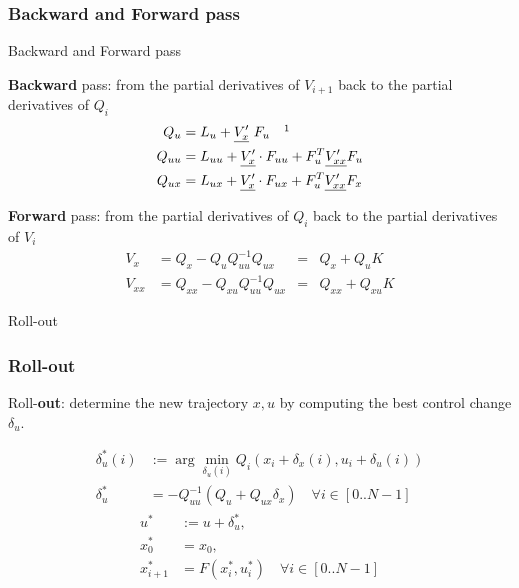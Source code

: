 \documentclass{beamer}
\begin{document}
\subsubsection{Backward and Forward pass}

\begin{frame}{Backward and Forward pass}

\textbf{Backward} pass: from the partial derivatives of $V_{i+1}$ back to the partial derivatives of $Q_i$
\begin{equation}
\label{QfromV}
\begin{split}
Q_u & = L_u + \underline{V'_x}   \ F_u \quad \footnotemark \\
Q_{uu} &= L_{uu} + \underline{V'_x} \cdot F_{uu} + F_u^T \underline{V'_{xx}} F_u \\
Q_{ux} &= L_{ux} + \underline{V'_x} \cdot F_{ux} + F_u^T \underline{V'_{xx}} F_x
\end{split}
\end{equation}


\textbf{Forward} pass: from the partial derivatives of $Q_i$ back to the partial derivatives of $V_i$
\begin{equation}
\label{VfromQ}
\begin{aligned}
V_x &= Q_x - Q_u Q_{uu}^{-1} Q_{ux} &=& Q_x + Q_u K \\
V_{xx} &= Q_{xx} - Q_{xu} Q_{uu}^{-1} Q_{ux} &=& Q_{xx} + Q_{xu} K
\end{aligned}
\end{equation}

\end{frame}


\begin{frame}{Roll-out}
\subsubsection{Roll-out}
Roll-\textbf{out}: determine the new trajectory $x, u$ by computing the best control change $\delta_u$.

\begin{equation}
\begin{split}
\delta_u^* (i) &:= \arg\min_{\delta_u(i)}Q_i(x_i + \delta_x(i), u_i + \delta_u(i) ) \\
\delta_u^* &=  - Q_{uu}^{-1} (Q_u + Q_{ux} \delta_x) \quad \forall i \in [0 .. N-1]
\end{split}
\end{equation} 
\begin{equation}
\begin{split}
u^* &:= u + \delta_u^*, \\
x^*_0      &= x_0,  \\ %
x_{i+1}^*     &= F(x_i^*, u_i^*) \quad \forall i \in [0 .. N-1]
\end{split}
\end{equation}

\end{frame}
\end{document}
